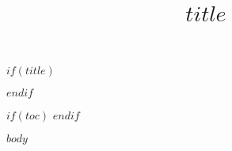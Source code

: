 \documentclass{article}
\begin{document}
$if(title)$
\title{$title$}
\maketitle
$endif$

$if(toc)$
\tableofcontents
$endif$

$body$
\end{document}
